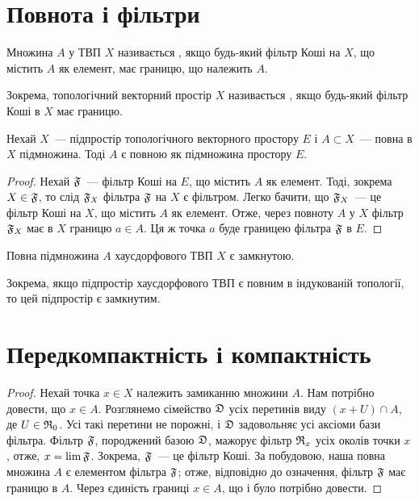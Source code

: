 \section{Повнота і фільтри}

\begin{definition}
    Множина $A$ у ТВП $X$ називається , якщо будь-який фільтр Коші на $X$, що містить $A$ як елемент, має границю, що належить $A$.
\end{definition}

\begin{remark}
    Зокрема, топологічний векторний простір $X$ називається , якщо будь-який фільтр Коші в $X$ має границю.
\end{remark}

\begin{theorem}
    Нехай $X$~--- підпростір топологічного векторного простору $E$ і $A \subset X$~--- повна в $X$ підмножина. Тоді $A$ є повною як підмножина простору $E$.
\end{theorem}

\begin{proof}
    Нехай $\frak F$~--- фільтр Коші на $E$, що містить $A$ як елемент. Тоді, зокрема $X \in \frak F$, то слід $\frak F_X$ фільтра $\frak F$ на $X$ є фільтром. Легко бачити, що $\frak F_X$~--- це фільтр Коші на $X$, що містить $A$ як елемент. Отже, через повноту $A$ у $X$ фільтр $\frak F_X$ має в $X$ границю $a \in A$. Ця ж точка $a$ буде границею фільтра $\frak F$ в $E$.
\end{proof}

\begin{theorem}
    Повна підмножина $A$ хаусдорфового ТВП $X$ є замкнутою.
\end{theorem}

\begin{remark}
    Зокрема, якщо підпростір хаусдорфового ТВП є повним в індукованій топології, то цей підпростір є замкнутим.
\end{remark}

\section{Передкомпактність і компактність}

\begin{proof}
    Нехай точка $x \in X$ належить замиканню множини $A$. Нам потрібно довести, що $x \in A$. Розглянемо сімейство $\frak D$ усіх перетинів виду $(x + U) \cap A$, де $U \in \frak R_0$. Усі такі перетини не порожні, і $\frak D$ задовольняє усі аксіоми бази фільтра. Фільтр $\frak F$, породжений базою $\frak D$, мажорує фільтр $\frak R_x$ усіх околів точки $x$, отже, $x = \lim \frak F$. Зокрема, $\frak F$~--- це фільтр Коші. За побудовою, наша повна множина $A$ є елементом фільтра $\frak F$; отже, відповідно до означення, фільтр $\frak F$ має границю в $A$. Через єдиність границі $x \in A$, що і було потрібно довести.
\end{proof}

